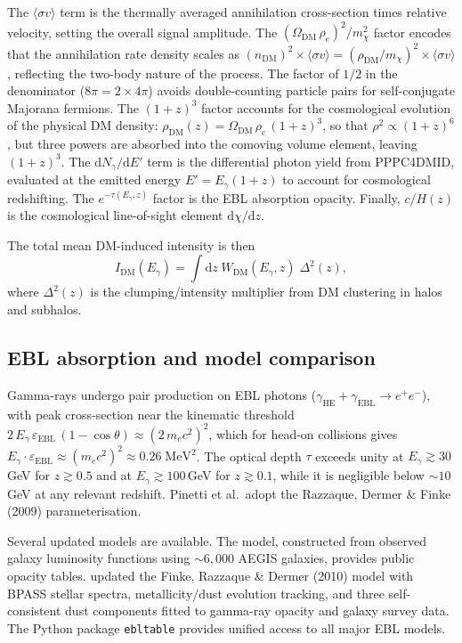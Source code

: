 \documentclass[10pt,a4paper]{article}
\newcommand{\sigv}{\langle\sigma v\rangle}
\newcommand{\mchi}{m_\chi}
\newcommand{\rhoc}{\rho_{\mathrm{c}}}
\newcommand{\OmDM}{\Omega_{\mathrm{DM}}}
\begin{document}
The $\sigv$ term is the thermally averaged annihilation cross-section times relative velocity, setting the overall signal amplitude. The $(\OmDM\,\rhoc)^2/\mchi^2$ factor encodes that the annihilation rate density scales as $(n_{\mathrm{DM}})^2 \times \sigv = (\rho_{\mathrm{DM}}/\mchi)^2 \times \sigv$, reflecting the two-body nature of the process. The factor of $1/2$ in the denominator ($8\pi = 2 \times 4\pi$) avoids double-counting particle pairs for self-conjugate Majorana fermions. The $(1+z)^3$ factor accounts for the cosmological evolution of the physical DM density: $\rho_{\mathrm{DM}}(z) = \OmDM\,\rhoc\,(1+z)^3$, so that $\rho^2 \propto (1+z)^6$, but three powers are absorbed into the comoving volume element, leaving $(1+z)^3$. The $\mathrm{d}N_\gamma/\mathrm{d}E'$ term is the differential photon yield from PPPC4DMID, evaluated at the emitted energy $E' = E_\gamma(1+z)$ to account for cosmological redshifting. The $e^{-\tau(E_\gamma,z)}$ factor is the EBL absorption opacity. Finally, $c/H(z)$ is the cosmological line-of-sight element $\mathrm{d}\chi/\mathrm{d}z$.

The total mean DM-induced intensity is then
\begin{equation}
    I_{\mathrm{DM}}(E_\gamma) = \int \mathrm{d}z\; W_{\mathrm{DM}}(E_\gamma, z)\;\Delta^2(z),
\end{equation}
where $\Delta^2(z)$ is the clumping/intensity multiplier from DM clustering in halos and subhalos.

\subsection{EBL absorption and model comparison}

Gamma-rays undergo pair production on EBL photons ($\gamma_{\mathrm{HE}} + \gamma_{\mathrm{EBL}} \to e^+e^-$), with peak cross-section near the kinematic threshold $2\,E_\gamma\,\varepsilon_{\mathrm{EBL}}\,(1-\cos\theta) \approx (2\,m_e c^2)^2$, which for head-on collisions gives $E_\gamma \cdot \varepsilon_{\mathrm{EBL}} \approx (m_e c^2)^2 \approx 0.26\;\mathrm{MeV^2}$. The optical depth $\tau$ exceeds unity at $E_\gamma \gtrsim 30$\,GeV for $z \gtrsim 0.5$ and at $E_\gamma \gtrsim 100$\,GeV for $z \gtrsim 0.1$, while it is negligible below $\sim10$\,GeV at any relevant redshift. Pinetti et al.\ adopt the Razzaque, Dermer \& Finke (2009) parameterisation.

Several updated models are available. The \citet{Dominguez2011} model, constructed from observed galaxy luminosity functions using $\sim6{,}000$ AEGIS galaxies, provides public opacity tables. \citet{Finke2022} updated the Finke, Razzaque \& Dermer (2010) model with BPASS stellar spectra, metallicity/dust evolution tracking, and three self-consistent dust components fitted to gamma-ray opacity and galaxy survey data. The Python package \texttt{ebltable} provides unified access to all major EBL models.
\end{document}
